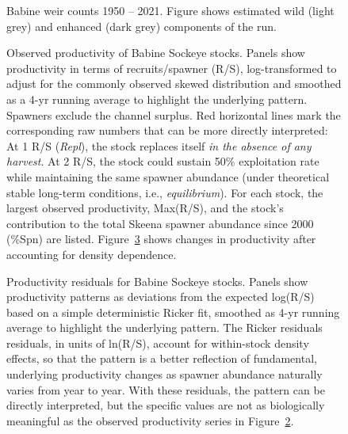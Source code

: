 \documentclass[french,11pt]{book}
\begin{document}
\begin{figure}[htb]

{\centering {} 

}

\caption{Babine weir counts 1950 -- 2021. Figure shows estimated wild (light grey) and enhanced (dark grey) components of the run.}\label{fig:BabineCounts}
\end{figure}
\clearpage


\begin{figure}[htb]

{\centering {} 

}

\caption{Observed productivity of Babine Sockeye stocks. Panels show productivity in terms of recruits/spawner (R/S), log-transformed to adjust for the commonly observed skewed distribution and smoothed as a 4-yr running average to highlight the underlying pattern. Spawners exclude the channel surplus. Red horizontal lines mark the corresponding raw numbers that can be more directly interpreted: At 1 R/S (\emph{Repl}), the stock replaces itself \emph{in the absence of any harvest}. At 2 R/S, the stock could sustain 50\% exploitation rate while maintaining the same spawner abundance (under theoretical stable long-term conditions, i.e., \emph{equilibrium}). For each stock, the largest observed productivity, Max(R/S), and the stock's contribution to the total Skeena spawner abundance since 2000 (\%Spn) are listed. Figure~\ref{fig:BabineProdResid} shows changes in productivity after accounting for density dependence.}\label{fig:BabineProdRpS}
\end{figure}

\begin{figure}[htb]

{\centering {} 

}

\caption{Productivity residuals for Babine Sockeye stocks. Panels show productivity patterns as deviations from the expected log(R/S) based on a simple deterministic Ricker fit, smoothed as 4-yr running average to highlight the underlying pattern. The Ricker residuals residuals, in units of ln(R/S), account for within-stock density effects, so that the pattern is a better reflection of fundamental, underlying productivity changes as spawner abundance naturally varies from year to year. With these residuals, the pattern can be directly interpreted, but the specific values are not as biologically meaningful as the observed productivity series in Figure~\ref{fig:BabineProdRpS}.}\label{fig:BabineProdResid}
\end{figure}
\clearpage
\end{document}

